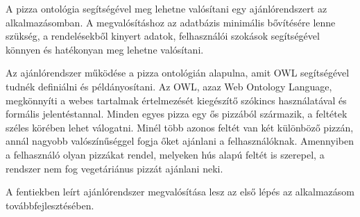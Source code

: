 A pizza ontológia segítségével meg lehetne valósítani egy ajánlórendszert az alkalmazásomban. A megvalósításhoz az adatbázis minimális bővítésére lenne szükség, a rendelésekből kinyert adatok, felhasználói szokások segítségével könnyen és hatékonyan meg lehetne valósítani.

Az ajánlórendszer működése a pizza ontológián alapulna, amit OWL segítségével tudnék definiálni és példányosítani. Az OWL, azaz Web Ontology Language, megkönnyíti a webes tartalmak értelmezését kiegészítő szókincs használatával és formális jelentéstannal. Minden egyes pizza egy ős pizzából származik, a feltétek széles körében lehet válogatni. Minél több azonos feltét van két különböző pizzán, annál nagyobb valószínűséggel fogja őket ajánlani a felhasználóknak. Amennyiben a felhasználó olyan pizzákat rendel, melyeken hús alapú feltét is szerepel, a rendszer nem fog vegetáriánus pizzát ajánlani neki.

A fentiekben leírt ajánlórendszer megvalósítása lesz az első lépés az alkalmazásom továbbfejlesztésében. 
